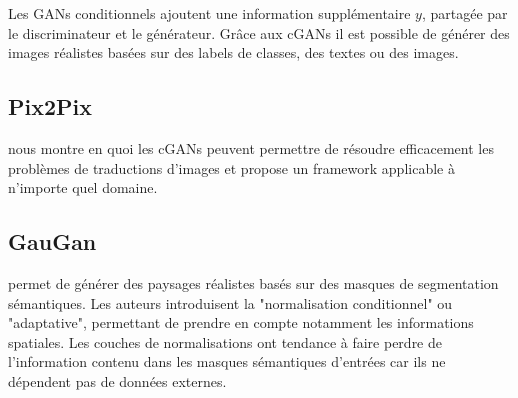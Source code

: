 \documentclass[a4paper, 12pt]{report}
\begin{document}
Les GANs conditionnels ajoutent une information supplémentaire $y$, partagée par le discriminateur et le générateur. Grâce aux cGANs il est possible de générer des images réalistes basées sur des labels de classes, des textes ou des images.

\subsection{Pix2Pix}
\cite{DBLP:journals/corr/GatysEB15a} nous montre en quoi les cGANs peuvent permettre de résoudre efficacement les problèmes de traductions d'images et propose un framework applicable à n'importe quel domaine.

\subsection{GauGan}
\cite{DBLP:journals/corr/abs-1903-07291} permet de générer des paysages réalistes basés sur des masques de segmentation sémantiques. Les auteurs introduisent la "normalisation conditionnel" ou "adaptative", permettant de prendre en compte notamment les informations spatiales.
Les couches de normalisations ont tendance à faire perdre de l'information contenu dans les masques sémantiques d'entrées car ils ne dépendent pas de données externes.
\end{document}
